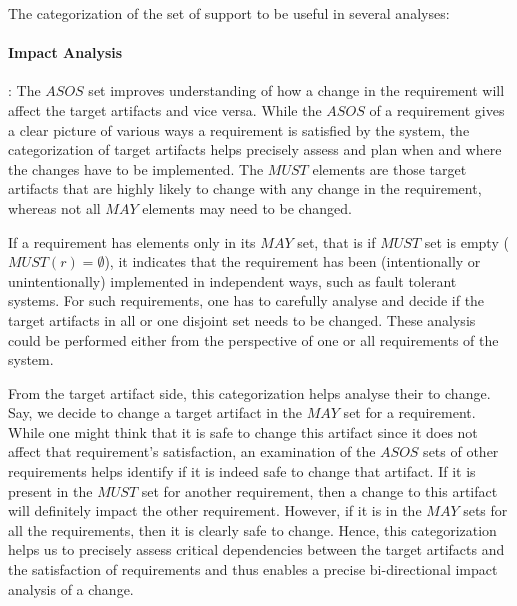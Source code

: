 The categorization of the set of support to be useful in several analyses:

\paragraph{Impact Analysis}: The $ASOS$ set improves understanding of how a change in the requirement will affect the target artifacts and vice versa. While the $ASOS$ of a requirement gives a clear picture of various ways a requirement is satisfied by the system, the categorization of target artifacts helps precisely assess and plan when and where the changes have to be implemented. The $MUST$ elements are those target artifacts that are highly likely to change with any change in the requirement, whereas not all $MAY$ elements may need to be changed. 

If a requirement has elements only in its $MAY$ set, that is if $MUST$ set is empty ($MUST(r) = \emptyset$), it indicates that the requirement has been (intentionally or unintentionally) implemented in independent ways, such as fault tolerant systems. For such requirements, one has to carefully analyse and decide if the target artifacts in all or one disjoint set needs to be changed. These analysis could be performed either from the perspective of one or all requirements of the system.

From the target artifact side, this categorization helps analyse their  to change. Say, we decide to change a target artifact in the $MAY$ set for a requirement. While one might think that it is safe to change this artifact since it does not affect that requirement's satisfaction, an examination of the $ASOS$ sets of other requirements helps identify if it is indeed safe to change that artifact. If it is present in the $MUST$ set for another requirement, then a change to this artifact will definitely impact the other requirement. However, if it is in the $MAY$ sets for all the requirements, then it is clearly safe to change. Hence, this categorization helps us to precisely assess critical dependencies between the target artifacts and the satisfaction of requirements and thus enables a precise bi-directional impact analysis of a change.


